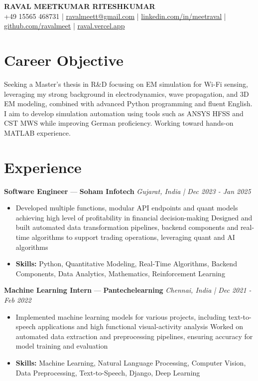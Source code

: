 \documentclass[a4paper,10pt]{article}
\begin{document}
\begin{center}
  {\Large\bfseries RAVAL MEETKUMAR RITESHKUMAR}\\[2pt]
  {\small +49 15565 468731 \;|\; \href{mailto:ravalmeett@gmail.com}{ravalmeett@gmail.com} \;|\; \href{https://www.linkedin.com/in/meetraval/}{linkedin.com/in/meetraval} \;|\; \href{https://github.com/ravalmeet}{github.com/ravalmeet} \;|\; \href{https://raval.vercel.app/}{raval.vercel.app}}
\end{center}
\vspace{-3pt}

\section*{Career Objective}
Seeking a Master's thesis in R\&D focusing on EM simulation for Wi-Fi sensing, leveraging my strong background in electrodynamics, wave propagation, and 3D EM modeling, combined with advanced Python programming and fluent English. I aim to develop simulation automation using tools such as ANSYS HFSS and CST MWS while improving German proficiency. Working toward hands-on MATLAB experience.\par

\section*{Experience}
\textbf{Software Engineer} — \textbf{Soham Infotech} \hfill \textit{Gujarat, India \;|\; Dec 2023 - Jan 2025}\par
\vspace{1pt}
\begin{itemize}
  \item Developed multiple functions, modular API endpoints and quant models achieving high level of profitability in financial decision-making Designed and built automated data transformation pipelines, backend components and real-time algorithms to support trading operations, leveraging quant and AI algorithms
  \item \textbf{Skills:} Python, Quantitative Modeling, Real-Time Algorithms, Backend Components, Data Analytics, Mathematics, Reinforcement Learning
\end{itemize}
\vspace{3pt}
\textbf{Machine Learning Intern} — \textbf{Pantechelearning} \hfill \textit{Chennai, India \;|\; Dec 2021 - Feb 2022}\par
\vspace{1pt}
\begin{itemize}
  \item Implemented machine learning models for various projects, including text-to-speech applications and high functional visual-activity analysis Worked on automated data extraction and preprocessing pipelines, ensuring accuracy for model training and evaluation
  \item \textbf{Skills:} Machine Learning, Natural Language Processing, Computer Vision, Data Preprocessing, Text-to-Speech, Django, Deep Learning
\end{itemize}
\end{document}
